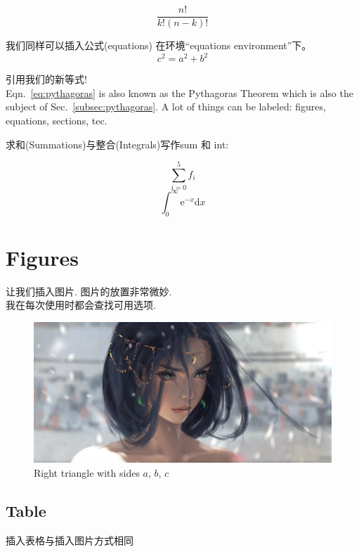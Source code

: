 \documentclass[fontset=adobe, 12pt]{article}
\begin{document}
$$ \frac{n!}{k!(n-k)!}$$

我们同样可以插入公式(equations) 在环境``equations environment''下。
\begin{equation}
  c^2 = a^2 + b^2
  \label{eq:pythagoras}
\end{equation}

引用我们的新等式!\\
Eqn.~\ref{eq:pythagoras} is also known as the Pythagoras Theorem which is also the subject of Sec.~\ref{subsec:pythagoras}. A lot of things can be labeled: figures, equations, sections, tec.

求和(Summations)与整合(Integrals)写作sum 和 int:

\begin{equation}
  \sum_{i=0}^{5} f_{i}
\end{equation}
\begin{equation}
  \int_{0}^{\infty} \mathrm{e}^{-x} \mathrm{d}x
\end{equation}

\newpage

\section{Figures}

让我们插入图片. 图片的放置非常微妙.\\
我在每次使用时都会查找可用选项.

\begin{figure}[H] %
  \centering %
  \includegraphics[width=0.8\linewidth]{picture.jpg}
  \caption{Right triangle with sides $a$, $b$, $c$}
  \label{fig:right-triangle}
\end{figure}

\subsection{Table}
插入表格与插入图片方式相同
\end{document}
